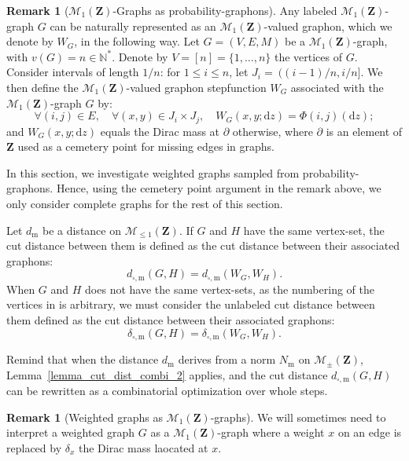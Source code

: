 \documentclass{amsart}
\theoremstyle{plain}
\theoremstyle{definition}
\newtheorem{remark}[Th]{Remark}
\newcommand{\Space}{\mathbf{Z}}
\newcommand{\Proba}{\mathcal{M}_1(\Space)}
\newcommand{\SubProba}{\mathcal{M}_{\leq1}(\Space)}
\newcommand{\SignedMeas}{\mathcal{M}_{\pm}(\Space)}
\newcommand{\m}{\mathrm{m}}
\newcommand{\dmeas}{d_\m}
\newcommand{\NmeasSymbol}{N_\m}
\newcommand{\dcut}{d_{\square,\m}}
\newcommand{\ddcut}{\delta_{\square,\m}}
\newcommand{\N}{\mathbb{N}}
\newcommand{\drv}{\mathrm{d}}
\begin{document}
\begin{remark}[$\Proba$-Graphs as probability-graphons]
	\label{rem_def_W_G}
Any labeled $\Proba$-graph $G$
can be naturally represented as an $\Proba$-valued graphon,
which we denote by $W_G$, in the following way.
Let $G = (V,E,M)$ be a $\Proba$-graph,
with $v(G)=n\in\N^*$.
Denote by $V = [n] = \{1,\dots,n\}$ the vertices of $G$.
Consider intervals of length $1/n$:
for $1\leq i\leq n$, let $J_i =\ ( (i-1)/n , i/n]$.
We then define the $\Proba$-valued graphon stepfunction $W_G$ 
associated with the $\Proba$-graph $G$ by:
\[ \forall (i,j)\in E,\quad 	\forall (x,y) \in J_i\times J_j,\quad 	W_G(x,y;\drv z) = 
\Phi(i,j)(\drv z) ;
\]
and $W_G(x,y;\drv z)$ equals the Dirac mass at $\partial$ otherwise,
where $\partial$ is an element of $\Space$ used as a cemetery point for missing edges in graphs.
\end{remark}

In this section, 
we investigate weighted graphs sampled from probability-graphons. Hence, using the cemetery point argument in the remark above,
we only consider complete graphs for the rest  of this section.

\medskip
Let $\dmeas$ be a distance on $\SubProba$.
If  $G$ and $H$ have the same vertex-set,
the cut distance between them is defined as the cut distance between their associated graphons:
\begin{equation*}
\dcut(G,H) = \dcut(W_G,W_H) . 
\end{equation*}
When $G$ and $H$ does not have the same vertex-sets, as the numbering of the vertices in  is arbitrary, we must consider 
the unlabeled cut distance between them  defined as the cut distance between their associated graphons:
\begin{equation*}
\ddcut(G,H) = \ddcut(W_G,W_H).
\end{equation*}

Remind that 
when the distance $\dmeas$ derives from a norm $\NmeasSymbol$
on $\SignedMeas$, 
Lemma~\ref{lemma_cut_dist_combi_2} applies,
and the cut distance $\dcut(G,H)$ can be rewritten as
a combinatorial optimization over whole steps.

\begin{remark}[Weighted graphs as $\Proba$-graphs]
	\label{weighted_graphs_as_proba_graphs}
We will sometimes need to interpret
a weighted graph $G$ as 
a $\Proba$-graph where a weight $x$ on an edge is replaced
by $\delta_x$ the Dirac mass laocated at $x$.
\end{remark}
\end{document}
